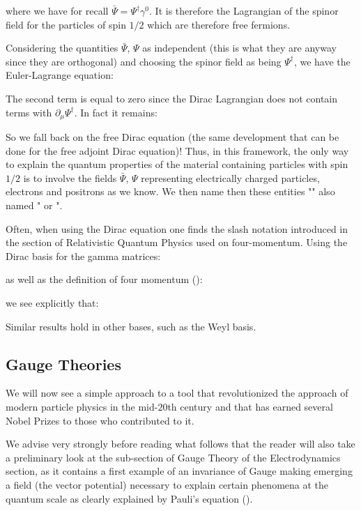 	where we have for recall $\bar{\Psi}=\Psi^\dagger \gamma^0$. It is therefore the Lagrangian of the spinor field for the particles of spin $1/2$ which are therefore free fermions.

	Considering the quantities $\bar{\Psi}$, $\Psi$ as independent (this is what they are anyway since they are orthogonal) and choosing the spinor field as being $\Psi^\dagger$, we have the Euler-Lagrange equation:
	
	The second term is equal to zero since the Dirac Lagrangian does not contain terms with $\partial_\mu\Psi^\dagger$. In fact it remains:
	
	So we fall back on the free Dirac equation (the same development that can be done for the free adjoint Dirac equation)! Thus, in this framework, the only way to explain the quantum properties of the material containing particles with spin $1/2$ is to involve the fields $\bar{\Psi}$, $\Psi$ representing electrically charged particles, electrons and positrons as we know. We then name then these entities "" also named " or ".

	\begin{tcolorbox}[title=Remark,colframe=black,arc=10pt]
	Often, when using the Dirac equation one finds the slash notation introduced in the section of Relativistic Quantum Physics used on four-momentum. Using the Dirac basis for the gamma matrices:
	
	as well as the definition of four momentum ():
	
	we see explicitly that:
	
	Similar results hold in other bases, such as the Weyl basis.
	\end{tcolorbox}
	
	\subsection{Gauge Theories}
	We will now see a simple approach to a tool that revolutionized the approach of modern particle physics in the mid-$20$th century and that has earned several Nobel Prizes to those who contributed to it.

	We advise very strongly before reading what follows that the reader will also take a preliminary look at the sub-section of Gauge Theory of the Electrodynamics section, as it contains a first example of an invariance of Gauge making emerging a field (the vector potential) necessary to explain certain phenomena at the quantum scale as clearly explained by Pauli's equation ().

